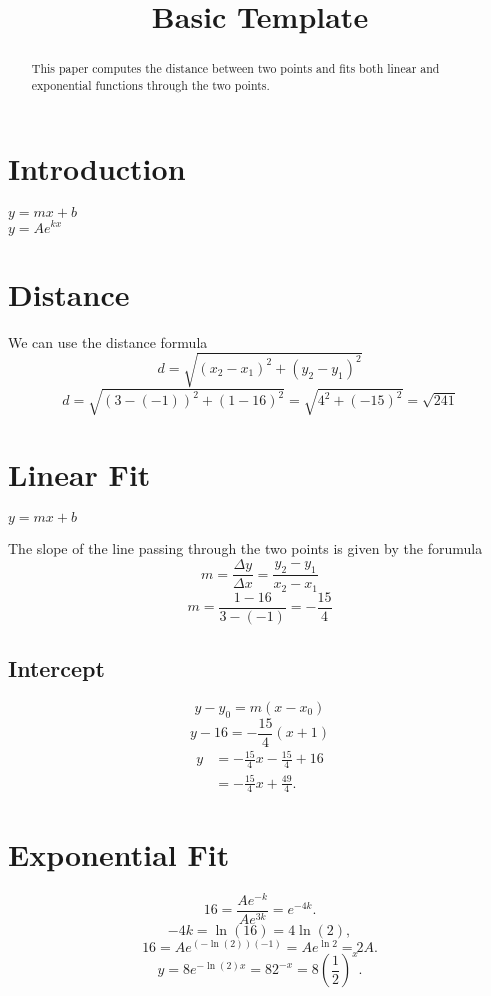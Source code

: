 \documentclass[10pt]{article}         %
\title{Basic Template}
\begin{document}
\maketitle

\begin{abstract}
This paper computes the distance between two points and fits both linear and
exponential functions through the two points.
\end{abstract}

\section{Introduction}
	$y = m x + b$ \\
	$y = A e^{k x}$

\section{Distance}
\label{distance}
We can use the distance formula
$$
d = \sqrt{(x_2 - x_1)^2 + (y_2 - y_1)^2}
$$
$$
d 
= \sqrt{(3 - (-1))^2 + (1 - 16)^2}
= \sqrt{4^2 + (-15)^2}
= \sqrt{241}
$$

\section{Linear Fit}
\label{Linear Fit}
$y = m x + b$


The slope of the line passing through the two points is given by the forumula
$$
	m 
	= \frac{\Delta y}{\Delta x} 
	= \frac{y_2 - y_1}{x_2 - x_1}
$$
$$
	m 
	= \frac{1 - 16}{3 - (-1)}
	= - \frac{15}{4}
$$

\subsection{Intercept}
\label{sec: intercept}

$$
	y - y_0 = m (x - x_0)
$$
$$
	y - 16 = - \frac{15}{4} (x + 1)
$$
\begin{align*}
	y 
	&= - \frac{15}{4} x - \frac{15}{4} + 16 \\
	&= - \frac{15}{4} x + \frac{49}{4}
	.
\end{align*}

\section{Exponential Fit}
\label{sec: exponential fit}

$$
	16
	= \frac{A e^{-k}}{A e^{3 k}}
	= e^{-4 k}
	.
$$
$$
	-4k = \ln(16) = 4 \ln (2)
	,
$$
$$
	16 = A e^{(-\ln(2))(-1)} = A e^{\ln{2}} = 2 A
	.
$$
$$
	y
	= 8 e^{-\ln(2) x}
	= 8 2^{-x}
	= 8 \left( \frac{1}{2} \right)^x
	.
$$
\end{document}
